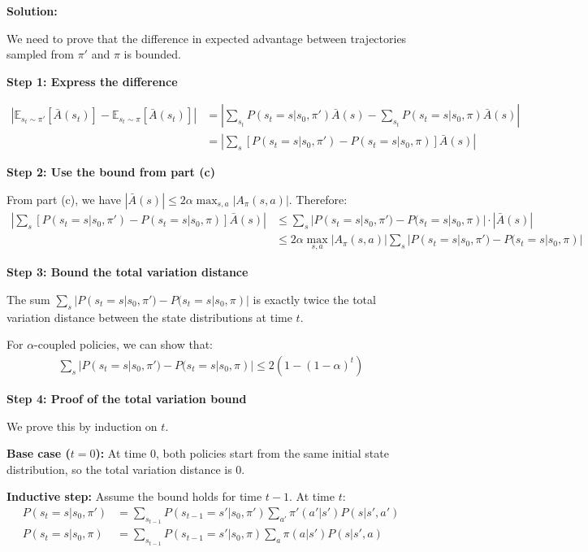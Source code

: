 \textbf{Solution:}

We need to prove that the difference in expected advantage between trajectories sampled from $\pi'$ and $\pi$ is bounded.

\textbf{Step 1: Express the difference}

\begin{align}
|\mathbb{E}_{s_t \sim \pi'}[\bar{A}(s_t)] - \mathbb{E}_{s_t \sim \pi}[\bar{A}(s_t)]| &= \left| \sum_{s_t} P(s_t = s | s_0, \pi') \bar{A}(s) - \sum_{s_t} P(s_t = s | s_0, \pi) \bar{A}(s) \right| \\
&= \left| \sum_{s} [P(s_t = s | s_0, \pi') - P(s_t = s | s_0, \pi)] \bar{A}(s) \right|
\end{align}

\textbf{Step 2: Use the bound from part (c)}

From part (c), we have $|\bar{A}(s)| \le 2\alpha \max_{s, a}|A_{\pi}(s,a)|$. Therefore:
\begin{align}
\left| \sum_{s} [P(s_t = s | s_0, \pi') - P(s_t = s | s_0, \pi)] \bar{A}(s) \right| &\le \sum_{s} |P(s_t = s | s_0, \pi') - P(s_t = s | s_0, \pi)| \cdot |\bar{A}(s)| \\
&\le 2\alpha \max_{s, a}|A_{\pi}(s,a)| \sum_{s} |P(s_t = s | s_0, \pi') - P(s_t = s | s_0, \pi)|
\end{align}

\textbf{Step 3: Bound the total variation distance}

The sum $\sum_{s} |P(s_t = s | s_0, \pi') - P(s_t = s | s_0, \pi)|$ is exactly twice the total variation distance between the state distributions at time $t$.

For $\alpha$-coupled policies, we can show that:
\begin{align}
\sum_{s} |P(s_t = s | s_0, \pi') - P(s_t = s | s_0, \pi)| \le 2(1-(1-\alpha)^t)
\end{align}

\textbf{Step 4: Proof of the total variation bound}

We prove this by induction on $t$.

\textbf{Base case ($t = 0$):} At time 0, both policies start from the same initial state distribution, so the total variation distance is 0.

\textbf{Inductive step:} Assume the bound holds for time $t-1$. At time $t$:
\begin{align}
P(s_t = s | s_0, \pi') &= \sum_{s_{t-1}} P(s_{t-1} = s' | s_0, \pi') \sum_{a'} \pi'(a'|s') P(s|s',a') \\
P(s_t = s | s_0, \pi) &= \sum_{s_{t-1}} P(s_{t-1} = s' | s_0, \pi) \sum_{a} \pi(a|s') P(s|s',a)
\end{align}

